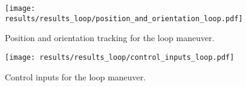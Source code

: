 \documentclass{article}
\begin{document}
\begin{figure}[h!]
    \centering
    \texttt{[image: results/results\_loop/position\_and\_orientation\_loop.pdf]}
    \caption{Position and orientation tracking for the loop maneuver.}
    \label{fig:loop_pos_orient}
\end{figure}

\begin{figure}[h!]
    \centering
    \texttt{[image: results/results\_loop/control\_inputs\_loop.pdf]}
    \caption{Control inputs for the loop maneuver.}
    \label{fig:loop_control}
\end{figure}
\end{document}
